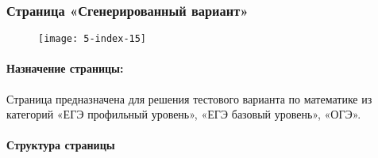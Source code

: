 \subsubsection{Страница «Сгенерированный вариант»}
\begin{figure}[H]
\texttt{[image: 5-index-15]}
\end{figure}
\paragraph{Назначение страницы:} Страница предназначена для решения тестового варианта по математике из категорий «ЕГЭ профильный уровень», «ЕГЭ базовый уровень», «ОГЭ».

\paragraph{Структура страницы}
